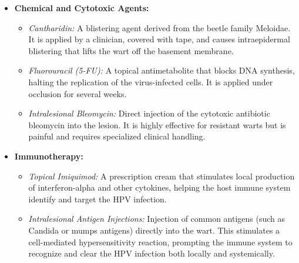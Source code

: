 \begin{itemize}
\begin{itemize}
        \item \textit{Laser Therapy:} Pulsed dye lasers (PDL) target the microvasculature supplying the wart, leading to tissue ischemia and necrosis. Carbon dioxide (CO2) lasers can also be used to vaporize the infected tissue. These treatments are costly and typically reserved for specialist clinics.
    \end{itemize}
    \item \textbf{Chemical and Cytotoxic Agents:}
    \begin{itemize}
        \item \textit{Cantharidin:} A blistering agent derived from the beetle family Meloidae. It is applied by a clinician, covered with tape, and causes intraepidermal blistering that lifts the wart off the basement membrane.
        \item \textit{Fluorouracil (5-FU):} A topical antimetabolite that blocks DNA synthesis, halting the replication of the virus-infected cells. It is applied under occlusion for several weeks.
        \item \textit{Intralesional Bleomycin:} Direct injection of the cytotoxic antibiotic bleomycin into the lesion. It is highly effective for resistant warts but is painful and requires specialized clinical handling.
    \end{itemize}
    \item \textbf{Immunotherapy:}
    \begin{itemize}
        \item \textit{Topical Imiquimod:} A prescription cream that stimulates local production of interferon-alpha and other cytokines, helping the host immune system identify and target the HPV infection.
        \item \textit{Intralesional Antigen Injections:} Injection of common antigens (such as Candida or mumps antigens) directly into the wart. This stimulates a cell-mediated hypersensitivity reaction, prompting the immune system to recognize and clear the HPV infection both locally and systemically.
    \end{itemize}
\end{itemize}

